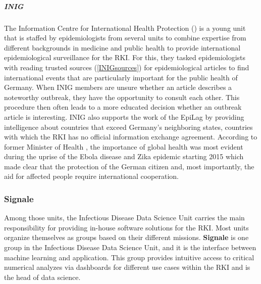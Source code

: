 \subparagraph{INIG}
The Information Centre for International Health Protection () is a young unit that is staffed by epidemiologists from several units to combine expertise from different backgrounds in medicine and public health to provide international epidemiological surveillance for the RKI.
For this, they tasked epidemiologists with reading trusted sources (\ref{INIGsources}) for epidemiological articles to find international events that are particularly important for the public health of Germany.
When INIG members are unsure whether an article describes a noteworthy outbreak, they have the opportunity to consult each other.
This procedure then often leads to a more educated decision whether an outbreak article is interesting.
INIG also supports the work of the EpiLag by providing intelligence about countries that exceed Germany's neighboring states, countries with which the RKI has no official information exchange agreement.
According to former Minister of Health \citeauthor{Grohe2017}, the importance of global health was most evident during the uprise of the Ebola disease and Zika epidemic starting 2015 which made clear that the protection of the German citizen and, most importantly, the aid for affected people require international cooperation.

\subsubsection{Signale}
Among those units, the Infectious Disease Data Science Unit carries the main responsibility for providing in-house software solutions for the RKI.
Most units organize themselves as groups based on their different missions.
\textbf{Signale} is one group in the Infectious Disease Data Science Unit, and it is the interface between machine learning and application.
This group provides intuitive access to critical numerical analyzes via dashboards for different use cases within the RKI and is the head of data science.




